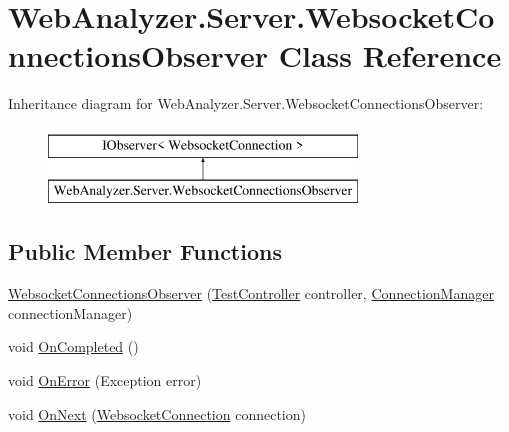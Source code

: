 \hypertarget{class_web_analyzer_1_1_server_1_1_websocket_connections_observer}{}\section{Web\+Analyzer.\+Server.\+Websocket\+Connections\+Observer Class Reference}
\label{class_web_analyzer_1_1_server_1_1_websocket_connections_observer}
Inheritance diagram for Web\+Analyzer.\+Server.\+Websocket\+Connections\+Observer\+:\begin{figure}[H]
\begin{center}
\leavevmode
\includegraphics[height=2.000000cm]{class_web_analyzer_1_1_server_1_1_websocket_connections_observer}
\end{center}
\end{figure}
\subsection*{Public Member Functions}
\begin{DoxyCompactItemize}
\item 
\hyperlink{class_web_analyzer_1_1_server_1_1_websocket_connections_observer_ab58aac7b482c3830fe3b6011f5817252}{Websocket\+Connections\+Observer} (\hyperlink{class_web_analyzer_1_1_controller_1_1_test_controller}{Test\+Controller} controller, \hyperlink{class_web_analyzer_1_1_server_1_1_connection_manager}{Connection\+Manager} connection\+Manager)
\item 
void \hyperlink{class_web_analyzer_1_1_server_1_1_websocket_connections_observer_ab390b748581070364777bb40976fd5f5}{On\+Completed} ()
\item 
void \hyperlink{class_web_analyzer_1_1_server_1_1_websocket_connections_observer_a5db5060833e71e8f9e33beedcf3ed353}{On\+Error} (Exception error)
\item 
void \hyperlink{class_web_analyzer_1_1_server_1_1_websocket_connections_observer_a029ee7e7c62cb440b9a3fce8a0d041ba}{On\+Next} (\hyperlink{class_web_analyzer_1_1_server_1_1_websocket_connection}{Websocket\+Connection} connection)
\end{DoxyCompactItemize}
